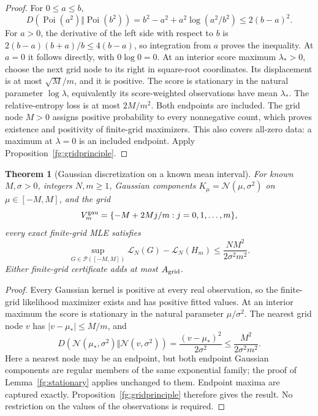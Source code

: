 \documentclass[11pt,a4paper]{article}
\newtheorem{theorem}{Theorem}[section]
\theoremstyle{definition}
\theoremstyle{remark}
\numberwithin{equation}{section}
\begin{document}
\begin{proof}
For $0\le a\le b$,
\[
 D(\operatorname{Poi}(a^2)\Vert\operatorname{Poi}(b^2))
 =b^2-a^2+a^2\log(a^2/b^2)\le2(b-a)^2.
\]
For $a>0$, the derivative of the left side with respect to $b$ is
$2(b-a)(b+a)/b\le4(b-a)$, so integration from $a$ proves the
inequality. At $a=0$ it follows directly, with $0\log0=0$.
At an interior score maximum $\lambda_*>0$, choose the next grid
node to its right in square-root coordinates. Its displacement is at
most $\sqrt M/m$, and it is positive. The score is stationary in
the natural parameter $\log\lambda$, equivalently its score-weighted
observations have mean $\lambda_*$. The relative-entropy loss is at
most $2M/m^2$. Both endpoints are included. The grid node $M>0$
assigns positive probability to every nonnegative count, which proves
existence and positivity of finite-grid maximizers. This also covers
all-zero data: a maximum at $\lambda=0$ is an included endpoint.
Apply Proposition~\ref{fg:gridprinciple}.
\end{proof}

\begin{theorem}[Gaussian discretization on a known mean interval]
\label{fg:gaussian}
For known $M,\sigma>0$, integers $N,m\ge1$, Gaussian components
$K_\mu=\mathcal N(\mu,\sigma^2)$ on $\mu\in[-M,M]$, and the grid
\[
              V_m^{\rm gau}=\{-M+2Mj/m:j=0,1,\ldots,m\},
\]
every exact finite-grid MLE satisfies
\begin{equation}\label{fg:gaudeficit}
 \sup_{G\in\mathcal P([-M,M])}\mathcal L_N(G)-\mathcal L_N(H_m)
                                 \le\frac{NM^2}{2\sigma^2m^2}.
\end{equation}
Either finite-grid certificate adds at most $A_{\rm grid}$.
\end{theorem}

\begin{proof}
Every Gaussian kernel is positive at every real observation, so the
finite-grid likelihood maximizer exists and has positive fitted values.
At an interior maximum the score is stationary in the natural parameter
$\mu/\sigma^2$. The nearest grid node $v$ has
$|v-\mu_*|\le M/m$, and
\[
 D(\mathcal N(\mu_*,\sigma^2)\Vert\mathcal N(v,\sigma^2))
                         =\frac{(v-\mu_*)^2}{2\sigma^2}
                         \le\frac{M^2}{2\sigma^2m^2}.
\]
Here a nearest node may be an endpoint, but both endpoint Gaussian
components are regular members of the same exponential family; the
proof of Lemma~\ref{fg:stationary} applies unchanged to them.
Endpoint maxima are captured exactly. Proposition~\ref{fg:gridprinciple}
therefore gives the result. No restriction on the values of the
observations is required.
\end{proof}
\end{document}
